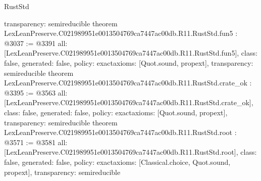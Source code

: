 \begin{lexlean}{RustStd}
\begin{coremodule}
{  transparency: semireducible
}
theorem LexLeanPreserve.C021989951e0013504769ca7447ac00db.R11.RustStd.fun5 : @3037 := @3391 {
  all: [LexLeanPreserve.C021989951e0013504769ca7447ac00db.R11.RustStd.fun5],
  class: false,
  generated: false,
  policy: exact{axioms: [Quot.sound, propext]},
  transparency: semireducible
}
theorem LexLeanPreserve.C021989951e0013504769ca7447ac00db.R11.RustStd.crate_ok : @3395 := @3563 {
  all: [LexLeanPreserve.C021989951e0013504769ca7447ac00db.R11.RustStd.crate_ok],
  class: false,
  generated: false,
  policy: exact{axioms: [Quot.sound, propext]},
  transparency: semireducible
}
theorem LexLeanPreserve.C021989951e0013504769ca7447ac00db.R11.RustStd.root : @3571 := @3581 {
  all: [LexLeanPreserve.C021989951e0013504769ca7447ac00db.R11.RustStd.root],
  class: false,
  generated: false,
  policy: exact{axioms: [Classical.choice, Quot.sound, propext]},
  transparency: semireducible
}


\end{coremodule}
\end{lexlean}
